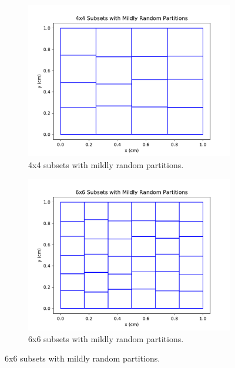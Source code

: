 \begin{figure}[H]
\centering
\begin{subfigure}[b]{0.45\textwidth}
  \includegraphics[width=\textwidth]{../cut_line_files/4_mild_random.pdf}
  \caption{4x4 subsets with mildly random partitions.}
  \label{4mildrandom}
\end{subfigure}
\begin{subfigure}[b]{0.45\textwidth}
  \includegraphics[width=\textwidth]{../cut_line_files/6_mild_random.pdf}
  \caption{6x6 subsets with mildly random partitions.}
  \label{6mildrandom}
\end{subfigure}


\end{figure}
